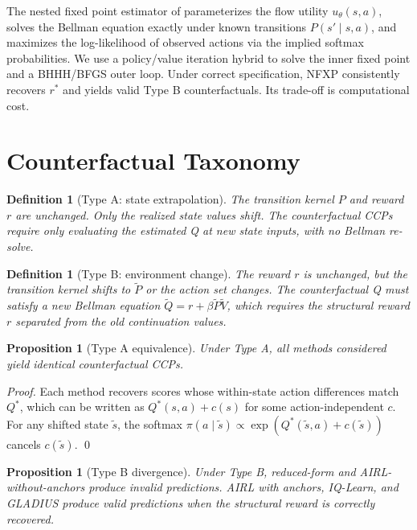 \documentclass[11pt]{article}
\newtheorem{proposition}[theorem]{Proposition}
\newtheorem{definition}[theorem]{Definition}
\begin{document}
The nested fixed point estimator of \citet{rust1987} parameterizes the flow utility $u_\theta(s,a)$, solves the Bellman equation exactly under known transitions $P(s'\mid s,a)$, and maximizes the log-likelihood of observed actions via the implied softmax probabilities. We use a policy/value iteration hybrid to solve the inner fixed point and a BHHH/BFGS outer loop. Under correct specification, NFXP consistently recovers $r^*$ and yields valid Type B counterfactuals. Its trade-off is computational cost.

\section{Counterfactual Taxonomy}

\begin{definition}[Type A: state extrapolation]
The transition kernel $P$ and reward $r$ are unchanged. Only the realized state values shift. The counterfactual CCPs require only evaluating the estimated Q at new state inputs, with no Bellman re-solve.
\end{definition}

\begin{definition}[Type B: environment change]
The reward $r$ is unchanged, but the transition kernel shifts to $\tilde{P}$ or the action set changes. The counterfactual Q must satisfy a new Bellman equation $\tilde{Q} = r + \beta \tilde{P}\tilde{V}$, which requires the structural reward $r$ separated from the old continuation values.
\end{definition}

\begin{proposition}[Type A equivalence]\label{prop:type1}
Under Type A, all methods considered yield identical counterfactual CCPs.
\end{proposition}
\begin{proof}
Each method recovers scores whose within-state action differences match $Q^*$, which can be written as $Q^*(s,a) + c(s)$ for some action-independent $c$. For any shifted state $\tilde{s}$, the softmax $\pi(a \mid \tilde{s}) \propto \exp(Q^*(\tilde{s},a) + c(\tilde{s}))$ cancels $c(\tilde{s})$. \qed
\end{proof}

\begin{proposition}[Type B divergence]\label{prop:type2}
Under Type B, reduced-form and AIRL-without-anchors produce invalid predictions. AIRL with anchors, IQ-Learn, and GLADIUS produce valid predictions when the structural reward is correctly recovered.
\end{proposition}
\end{document}
